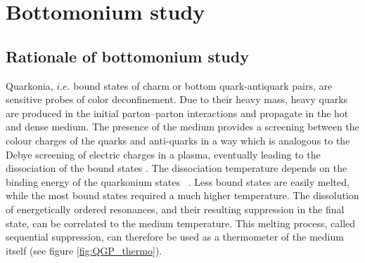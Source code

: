 \section{Bottomonium study}
\subsection{Rationale of bottomonium study} %

Quarkonia, $i.e.$ bound states of charm or bottom quark-antiquark pairs, are sensitive probes of color deconfinement. 
Due to their heavy mass, heavy quarks are produced in the initial parton--parton interactions and propagate in the hot and dense medium.
The presence of the medium provides a screening between the colour charges of the quarks and anti-quarks in a way which is analogous to the Debye screening of electric charges in a plasma, eventually leading to the dissociation of the bound states \cite{Matsui:1986dk,Brambilla:2010cs,Andronic:2015wma}.
The dissociation temperature depends on the binding energy of the quarkonium states ~\cite{Digal:2001ue}. 
Less bound states are easily melted, while the most bound states required a much higher temperature.
The dissolution of energetically ordered resonances, and their resulting suppression in the final state, can be correlated to the medium temperature.
This melting process, called sequential suppression, can therefore be used as a thermometer of the medium itself (see figure \ref{fig:QGP_thermo}).

